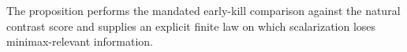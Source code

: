 The proposition performs the mandated early-kill comparison against the natural contrast score and supplies an explicit finite law on which scalarization loses minimax-relevant information.